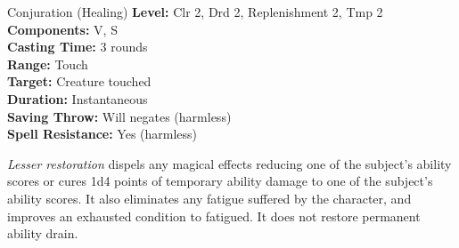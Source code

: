 {Conjuration (Healing)}
{
	\textbf{Level:}
	Clr 2, Drd 2, Replenishment 2, Tmp 2\\
	\textbf{Components:}
	V, S\\
	\textbf{Casting Time:}
	3 rounds\\
	\textbf{Range:}
	Touch\\
	\textbf{Target:}
	Creature touched\\
	\textbf{Duration:}
	Instantaneous\\
	\textbf{Saving Throw:}
	Will negates (harmless)\\
	\textbf{Spell Resistance:}
	Yes (harmless)\\
}
{
	\emph{Lesser restoration} dispels any magical effects reducing one of the subject's ability scores or cures 1d4 points of temporary ability damage to one of the subject's ability scores. It also eliminates any fatigue suffered by the character, and improves an exhausted condition to fatigued. It does not restore permanent ability drain.

}
